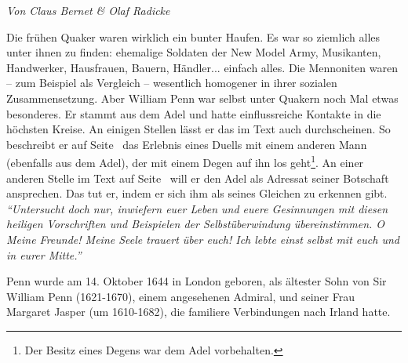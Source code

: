 %
%
%


\begin{flushright}
\begin{footnotesize}
\textit{Von Claus Bernet \& Olaf Radicke}
\end{footnotesize}
\end{flushright}
\smallskip

Die frühen Quaker waren wirklich ein bunter Haufen. Es war so ziemlich alles
unter ihnen zu finden: ehemalige Soldaten der New Model Army, Musikanten, Handwerker, Hausfrauen, Bauern, Händler... einfach alles.
Die Mennoniten waren --
zum Beispiel als Vergleich -- wesentlich homogener in ihrer sozialen Zusammensetzung.
Aber
William Penn war selbst unter Quakern noch Mal etwas besonderes. Er stammt aus
dem Adel und hatte einflussreiche Kontakte in die höchsten Kreise. An einigen
Stellen lässt er das im Text auch durchscheinen. So beschreibt er auf
Seite~\pageref{kap9_ab2_duell_penn} das Erlebnis eines Duells
mit einem anderen Mann (ebenfalls aus dem Adel), der mit einem Degen auf ihn los
geht\footnote{Der Besitz eines
Degens war dem Adel vorbehalten.}. An einer anderen Stelle im Text auf
Seite~\pageref{15_04_penn_alte_freunde} will er den Adel als Adressat seiner
Botschaft ansprechen. Das tut er, indem er sich ihm als seines Gleichen zu erkennen
gibt.
\textit{"`Untersucht doch nur, inwiefern euer Leben und euere Gesinnungen mit
diesen heiligen Vorschriften und Beispielen der Selbstüberwindung
übereinstimmen. O Meine Freunde! Meine Seele trauert über euch! Ich lebte einst
selbst mit euch und in eurer Mitte."'}

\medskip

Penn wurde am 14. Oktober 1644 in London
 geboren, als ältester Sohn von Sir William Penn
(1621-1670), einem angesehenen Admiral, und
seiner Frau Margaret Jasper (um 1610-1682),
die familiere Verbindungen nach Irland hatte.
\medskip

